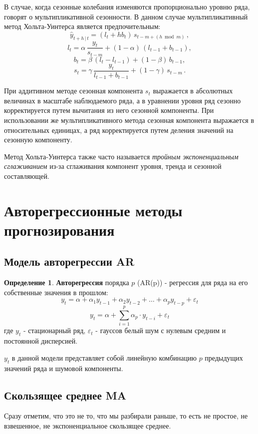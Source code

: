 \documentclass[aps,%
12pt,%
final,%
oneside,
onecolumn,%
musixtex, %
superscriptaddress,%
centertags]{article} %
\theoremstyle{plain}
\theoremstyle{definition}
\newtheorem{definition}{Определение}[subsection]
\theoremstyle{remark}
\begin{document}
В случае, когда сезонные колебания изменяются пропорционально уровню ряда, говорят о мультипликативной сезонности. В данном случае мультипликативный метод Хольта-Уинтерса является предпочительным:
$$\hat{y}_{t+h\, |\, t}=(l_t+hb_t)\, s_{t-m+(h\bmod m )}\, ,$$
$$l_t=\alpha\, \frac{y_t}{s_{t-m}}+(1-\alpha)\, (l_{t-1}+b_{t-1}),$$
$$b_t=\beta\, (l_t-l_{t-1})+(1-\beta)\, b_{t-1},$$
$$s_t=\gamma\, \frac{y_t}{l_{t-1}+b_{t-1}}+(1-\gamma)\, s_{t-m}\, .$$

При аддитивном методе сезонная компонента $s_t$ выражается в абсолютных величинах в масштабе наблюдаемого ряда, а в уравнении уровня ряд сезонно корректируется путем вычитания из него сезонной компоненты. При использовании же мультипликативного метода сезонная компонента выражается в относительных единицах, а ряд корректируется путем деления значений на сезонную компоненту.

Метод Хольта-Уинтерса также часто называется \textit{тройным экспоненциальным сглаживанием} из-за сглаживания компонент уровня, тренда и сезонной составляющей.

\newpage

\section{Авторегрессионные методы прогнозирования}

\subsection{Модель авторегрессии AR}

\begin{definition}
	\textbf{Авторегрессия} порядка $p$ (AR(p)) - регрессия для ряда на его собственные значения в прошлом:
	$$y_t = \alpha + \alpha_1y_{t-1} + \alpha_2 y_{t-2} + \ldots + \alpha_py_{t-p} + \varepsilon_t$$
	$$y_t = \alpha + \sum\limits_{i=1}^p \alpha_p\cdot y_{t-i} + \varepsilon_t$$
	где $y_t$ - стационарный ряд, $\varepsilon_t$ - гауссов белый шум с нулевым средним и постоянной дисперсией.
\end{definition}

$y_t$ в данной модели представляет собой линейную комбинацию $p$ предыдущих значений ряда и шумовой компоненты.

\newpage
\subsection{Скользящее среднее MA}

Сразу отметим, что это не то, что мы разбирали раньше, то есть не простое, не взвешенное, не экспоненциальное скользящее среднее.
\end{document}
